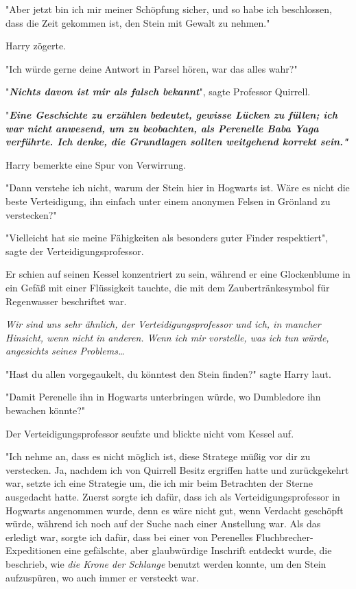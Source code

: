{"Aber jetzt bin ich mir meiner Schöpfung sicher, und so habe ich beschlossen, dass die Zeit gekommen ist, den Stein mit Gewalt zu nehmen."

Harry zögerte.

"Ich würde gerne deine Antwort in Parsel hören, war das alles wahr?"

"\textbf{\emph{Nichts davon ist mir als falsch bekannt}}", sagte Professor Quirrell.

"\textbf{\emph{Eine Geschichte zu erzählen bedeutet, gewisse Lücken zu füllen; ich war nicht anwesend, um zu beobachten, als Perenelle Baba Yaga verführte. Ich denke, die Grundlagen sollten weitgehend korrekt sein."}}

Harry bemerkte eine Spur von Verwirrung.

"Dann verstehe ich nicht, warum der Stein hier in Hogwarts ist. Wäre es nicht die beste Verteidigung, ihn einfach unter einem anonymen Felsen in Grönland zu verstecken?"

"Vielleicht hat sie meine Fähigkeiten als besonders guter Finder respektiert", sagte der Verteidigungsprofessor.

Er schien auf seinen Kessel konzentriert zu sein, während er eine Glockenblume in ein Gefäß mit einer Flüssigkeit tauchte, die mit dem Zaubertränkesymbol für Regenwasser beschriftet war.

\emph{Wir sind uns sehr ähnlich, der Verteidigungsprofessor und ich, in mancher Hinsicht, wenn nicht in anderen. Wenn ich mir vorstelle, was ich tun würde, angesichts seines Problems…}

"Hast du allen vorgegaukelt, du könntest den Stein finden?" sagte Harry laut.

"Damit Perenelle ihn in Hogwarts unterbringen würde, wo Dumbledore ihn bewachen könnte?"

Der Verteidigungsprofessor seufzte und blickte nicht vom Kessel auf.

"Ich nehme an, dass es nicht möglich ist, diese Stratege müßig vor dir zu verstecken. Ja, nachdem ich von Quirrell Besitz ergriffen hatte und zurückgekehrt war, setzte ich eine Strategie um, die ich mir beim Betrachten der Sterne ausgedacht hatte. Zuerst sorgte ich dafür, dass ich als Verteidigungsprofessor in Hogwarts angenommen wurde, denn es wäre nicht gut, wenn Verdacht geschöpft würde, während ich noch auf der Suche nach einer Anstellung war. Als das erledigt war, sorgte ich dafür, dass bei einer von Perenelles Fluchbrecher-Expeditionen eine gefälschte, aber glaubwürdige Inschrift entdeckt wurde, die beschrieb, wie \emph{die Krone der Schlange} benutzt werden konnte, um den Stein aufzuspüren, wo auch immer er versteckt war.

}
